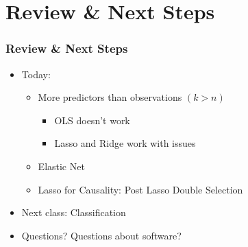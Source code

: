 \documentclass[
  shownotes,
  xcolor={svgnames},
  hyperref={colorlinks,citecolor=DarkBlue,linkcolor=DarkRed,urlcolor=DarkBlue}
  , aspectratio=169]{beamer}
\begin{document}
\section{Review \& Next Steps}
\begin{frame}
\frametitle{Review \& Next Steps}
  
\begin{itemize} 
    \item Today:
    \medskip
    \begin{itemize} 
      \item More predictors than observations $(k > n)$
        \begin{itemize}  
            \item OLS doesn't work
            \item Lasso and Ridge work with issues
        \end{itemize}      
     \medskip   
    \item Elastic Net
    \medskip
    \item Lasso for Causality: Post Lasso Double Selection


    \end{itemize}
    \bigskip  
  \item  Next class:  Classification


\bigskip  
\item Questions? Questions about software? 

\end{itemize}
\end{frame}
\end{document}
